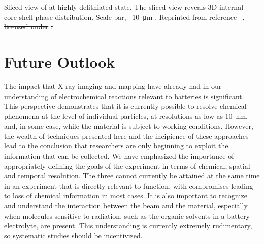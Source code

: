 \documentclass[journal=cmatex,manuscript=perspective]{achemso}
\providecommand{\DIFdeltex}[1]{{\protect\color{red}\sout{#1}}}                      %
\providecommand{\DIFdelend}{} %
\providecommand{\DIFdelFL}[1]{\DIFdel{#1}} %
\providecommand{\DIFdel}[1]{\texorpdfstring{\DIFdeltex{#1}}{}} %
\begin{document}
{%
\DIFdelFL{Sliced view of  at highly delithiated
    state. The sliced view reveals 3D internal core-shell phase
    distribution. Scale bar, \mbox{%
\SI{10}{\micro\metre}}%
. Reprinted from
    reference\mbox{%
\cite{wang2016}}%
, licensed under
    }%
\DIFdelFL{.}}

\DIFdelend \section{Future Outlook}

The impact that X-ray imaging and mapping have already had in our
understanding of electrochemical reactions relevant to batteries is
significant. This perspective demonstrates that it is currently
possible to resolve chemical phenomena at the level of individual
particles, at resolutions as low as \SI{10}{nm}, and, in some case,
while the material is subject to working conditions. However, the
wealth of techniques presented here and the incipience of these
approaches lead to the conclusion that researchers are only beginning
to exploit the information that can be collected. We have emphasized
the importance of appropriately defining the goals of the experiment
in terms of chemical, spatial and temporal resolution. The three
cannot currently be attained at the same time in an experiment that is
directly relevant to function, with compromises leading to loss of
chemical information in most cases. It is also important to recognize
and understand the interaction between the beam and the material,
especially when molecules sensitive to radiation, such as the organic
solvents in a battery electrolyte, are present. This understanding is
currently extremely rudimentary, so systematic studies should be
incentivized.
\end{document}
